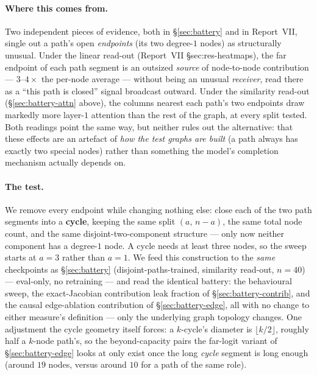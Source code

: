 \documentclass[11pt,a4paper]{article}
\begin{document}
\paragraph{Where this comes from.} Two independent pieces of evidence, both
in \S\ref{sec:battery} and in Report~VII, single out a path's open
\emph{endpoints} (its two degree-$1$ nodes) as structurally unusual. Under the
linear read-out (Report~VII \S sec:res-heatmaps), the far endpoint of each
path segment is an outsized \emph{source} of node-to-node contribution ---
$3$--$4\times$ the per-node average --- without being an unusual
\emph{receiver}, read there as a ``this path is closed'' signal broadcast
outward. Under the similarity read-out (\S\ref{sec:battery-attn} above), the
columns nearest each path's two endpoints draw markedly more layer-$1$
attention than the rest of the graph, at every split tested. Both readings
point the same way, but neither rules out the alternative: that these effects
are an artefact of \emph{how the test graphs are built} (a path always has
exactly two special nodes) rather than something the model's completion
mechanism actually depends on.

\paragraph{The test.} We remove every endpoint while changing nothing else:
close each of the two path segments into a \textbf{cycle}, keeping the same
split $(a,\,n-a)$, the same total node count, and the same
disjoint-two-component structure --- only now neither component has a
degree-$1$ node. %
A cycle needs at least three nodes, so the sweep starts at
$a=3$ rather than $a=1$. We feed this construction to the \emph{same}
checkpoints as \S\ref{sec:battery} (disjoint-paths-trained, similarity
read-out, $n=40$) --- eval-only, no retraining --- and read the identical
battery: the behavioural sweep, the exact-Jacobian contribution leak
fraction of \S\ref{sec:battery-contrib}, and the causal edge-ablation
contribution of \S\ref{sec:battery-edge}, all with no change to either
measure's definition --- only the underlying graph topology changes. One
adjustment the cycle geometry itself forces: a $k$-cycle's diameter is
$\lfloor k/2\rfloor$, roughly half a $k$-node path's, so the
beyond-capacity pairs the far-logit variant of \S\ref{sec:battery-edge}
looks at only exist once the long \emph{cycle} segment is long enough
(around $19$ nodes, versus around $10$ for a path of the same role).
\end{document}
